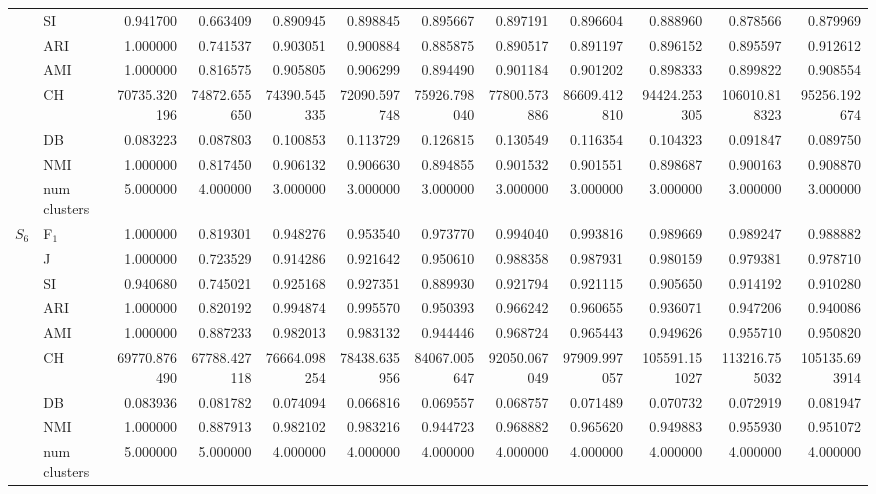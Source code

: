 \begin{tabular}{llrrrrrrrrrr}
 & SI & 0.941700 & 0.663409 & 0.890945 & 0.898845 & 0.895667 & 0.897191 & 0.896604 & 0.888960 & 0.878566 & 0.879969 \\
 & ARI & 1.000000 & 0.741537 & 0.903051 & 0.900884 & 0.885875 & 0.890517 & 0.891197 & 0.896152 & 0.895597 & 0.912612 \\
 & AMI & 1.000000 & 0.816575 & 0.905805 & 0.906299 & 0.894490 & 0.901184 & 0.901202 & 0.898333 & 0.899822 & 0.908554 \\
 & CH & 70735.320196 & 74872.655650 & 74390.545335 & 72090.597748 & 75926.798040 & 77800.573886 & 86609.412810 & 94424.253305 & 106010.818323 & 95256.192674 \\
 & DB & 0.083223 & 0.087803 & 0.100853 & 0.113729 & 0.126815 & 0.130549 & 0.116354 & 0.104323 & 0.091847 & 0.089750 \\
 & NMI & 1.000000 & 0.817450 & 0.906132 & 0.906630 & 0.894855 & 0.901532 & 0.901551 & 0.898687 & 0.900163 & 0.908870 \\
 & num clusters & 5.000000 & 4.000000 & 3.000000 & 3.000000 & 3.000000 & 3.000000 & 3.000000 & 3.000000 & 3.000000 & 3.000000 \\
\multirow[c]{9}{*}{$S_{6}$} & F$_1$ & 1.000000 & 0.819301 & 0.948276 & 0.953540 & 0.973770 & 0.994040 & 0.993816 & 0.989669 & 0.989247 & 0.988882 \\
 & J & 1.000000 & 0.723529 & 0.914286 & 0.921642 & 0.950610 & 0.988358 & 0.987931 & 0.980159 & 0.979381 & 0.978710 \\
 & SI & 0.940680 & 0.745021 & 0.925168 & 0.927351 & 0.889930 & 0.921794 & 0.921115 & 0.905650 & 0.914192 & 0.910280 \\
 & ARI & 1.000000 & 0.820192 & 0.994874 & 0.995570 & 0.950393 & 0.966242 & 0.960655 & 0.936071 & 0.947206 & 0.940086 \\
 & AMI & 1.000000 & 0.887233 & 0.982013 & 0.983132 & 0.944446 & 0.968724 & 0.965443 & 0.949626 & 0.955710 & 0.950820 \\
 & CH & 69770.876490 & 67788.427118 & 76664.098254 & 78438.635956 & 84067.005647 & 92050.067049 & 97909.997057 & 105591.151027 & 113216.755032 & 105135.693914 \\
 & DB & 0.083936 & 0.081782 & 0.074094 & 0.066816 & 0.069557 & 0.068757 & 0.071489 & 0.070732 & 0.072919 & 0.081947 \\
 & NMI & 1.000000 & 0.887913 & 0.982102 & 0.983216 & 0.944723 & 0.968882 & 0.965620 & 0.949883 & 0.955930 & 0.951072 \\
 & num clusters & 5.000000 & 5.000000 & 4.000000 & 4.000000 & 4.000000 & 4.000000 & 4.000000 & 4.000000 & 4.000000 & 4.000000 \\

\end{tabular}
